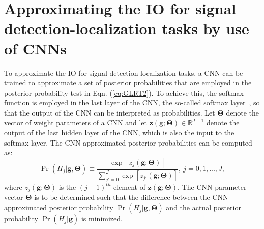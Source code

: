 \documentclass[journal]{IEEEtran}
\renewcommand{\vec}[1]{\mathbf{#1}}
\begin{document}
\section{Approximating the IO for signal detection-localization tasks by use of CNNs}
\label{sec:method}
To approximate the IO for signal detection-localization tasks,
a CNN can be trained to approximate a set of posterior probabilities that are employed in the posterior probability test  in Eqn. (\ref{eq:GLRT2}).
To achieve this, the softmax function is employed in the last layer of the CNN, the so-called softmax layer{~\cite{rawat2017deep}},
so that the output of the CNN can be interpreted as probabilities.
Let $\bm\Theta$ denote the vector of weight parameters of a CNN
 and let $\vec{z}(\vec{g}; \bm\Theta) \in \mathbb{R}^{J+1}$
 denote the output of the last hidden layer of the CNN, 
 which is also the input to the softmax layer.
The CNN-approximated posterior probabilities can be computed as: 
\begin{equation}
\Pr(H_j | \vec{g}, \bm\Theta) \equiv \frac{\exp[{z_j(\vec{g}; \bm\Theta)}]}{\sum_{j'=0}^{J}\exp[{z_{j'}(\vec{g}; \bm\Theta)}]},\ j = 0,1, ..., J, 
\label{eq:CNN-posterior}
\end{equation}
where $z_j(\vec{g}; \bm\Theta)$ is the $(j+1)^{th}$ element of $\vec{z}(\vec{g}; \bm\Theta)$.
The CNN parameter vector $\bm\Theta$ is to be determined such that the difference between the 
CNN-approximated posterior probability $\Pr(H_j | \vec{g}, \bm\Theta)$ and the actual posterior probability $\Pr(H_j | \vec{g})$ is minimized.
\end{document}
